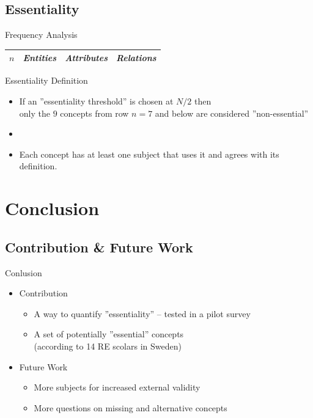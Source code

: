 \documentclass{slides}
\begin{document}
\subsection{Essentiality}
\begin{Slide}{Frequency Analysis}
\fontsize{6}{8}\selectfont

\begin{tabular}{l | p{} | p{} | p{}}
\textit{$n$} & \textit{Entities} & \textit{Attributes} & \textit{Relations} \\ \hline

\end{tabular}

\end{Slide}

\begin{Slide}{Essentiality Definition}
\begin{itemize}
\item If an ''essentiality threshold'' is chosen at $N/2$ then \\ only the $9$ concepts from row $n = 7$ and below are considered ''non-essential''
\item {} 
\item Each concept has at least one subject that uses it and agrees with its definition. 
\end{itemize}

\end{Slide}

\section{Conclusion}
\subsection{Contribution \& Future Work}
\begin{Slide}{Conlusion}

\begin{itemize} 
\item Contribution
\begin{itemize} 
\item A way to quantify ''essentiality'' -- tested in a pilot survey
\item A set of potentially ''essential'' concepts \\ (according to 14 RE scolars in Sweden)
\end{itemize}
\end{itemize}

\begin{itemize} 
\item Future Work
\begin{itemize} 
\item More subjects for increased external validity
\item More questions on missing and alternative concepts
\end{itemize}
\end{itemize}
\end{Slide}
\end{document}
